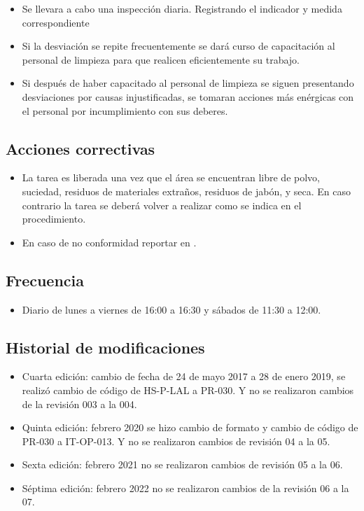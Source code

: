 \begin{itemize}
	\item Se llevara a cabo una inspección diaria. Registrando el indicador y medida correspondiente
	\item Si la desviación se repite frecuentemente se dará curso de capacitación al personal de limpieza para que realicen eficientemente su trabajo.
	\item Si después de haber capacitado al personal de limpieza se siguen presentando desviaciones por causas injustificadas, se tomaran acciones más enérgicas con el personal por incumplimiento con sus deberes.
\end{itemize}

\subsection{Acciones correctivas}

\begin{itemize}
	\item La tarea es liberada una vez que el área se encuentran libre de polvo, suciedad, residuos de materiales extraños, residuos de jabón, y seca. En caso contrario la tarea se deberá volver a realizar como se indica en el procedimiento.
	\item En caso de no conformidad reportar en \RAC.
\end{itemize}

\subsection{Frecuencia}

\begin{itemize}
	\item Diario de lunes a viernes de 16:00 a 16:30 y sábados de 11:30 a 12:00.
\end{itemize}

\subsection{Historial de modificaciones}

\begin{itemize}
	\item Cuarta edición: cambio de fecha de 24 de mayo 2017 a 28 de enero 2019, se realizó cambio de código de HS-P-LAL a PR-030. Y no se realizaron cambios de la revisión 003 a la 004.
	\item Quinta edición: febrero 2020 se hizo cambio de formato y cambio de código de PR-030 a IT-OP-013. Y no se realizaron cambios de revisión 04 a la 05.
	\item Sexta edición: febrero 2021 no se realizaron cambios de revisión 05 a la 06.
	\item Séptima edición: febrero 2022 no se realizaron cambios de la revisión 06 a la 07.
\end{itemize}
